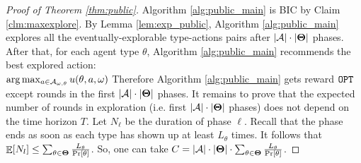 \begin{proof}[Proof of Theorem \ref{thm:public}]
Algorithm \ref{alg:public_main} is BIC  by Claim \ref{clm:maxexplore}. By Lemma \ref{lem:exp_public}, Algorithm \ref{alg:public_main} explores all the eventually-explorable type-actions pairs after $|\mathcal{A}|\cdot |\bold{\Theta}|$ phases.
After that, for each agent type $\theta$, Algorithm \ref{alg:public_main} recommends the best explored action: \\$ \arg\max_{a \in \mathcal{A}_{\omega,\theta}} u(\theta, a, \omega)$  
Therefore Algorithm \ref{alg:public_main} gets reward $\mathtt{OPT}$ except rounds in the first $|\mathcal{A}|\cdot |\bold{\Theta}|$ phases.  It remains to prove that the expected number of rounds in exploration (i.e. first $|\mathcal{A}|\cdot |\bold{\Theta}|$ phases) does not depend on the time horizon $T$. Let $N_\ell$ be the duration of phase $\ell$.
Recall that the phase ends as soon as each type has shown up at least $L_{\theta}$ times. It follows that
$ \mathop{\mathbb{E}}[N_l] \leq  \sum_{\theta\in\bold{\Theta}} \frac{L_{\theta}}{\Pr[\theta]}$.
So, one can take $C = |\mathcal{A}|\cdot |\bold{\Theta}|\cdot \sum_{\theta\in\bold{\Theta}} \frac{L_{\theta}}{\Pr[\theta]}$.
\end{proof}

